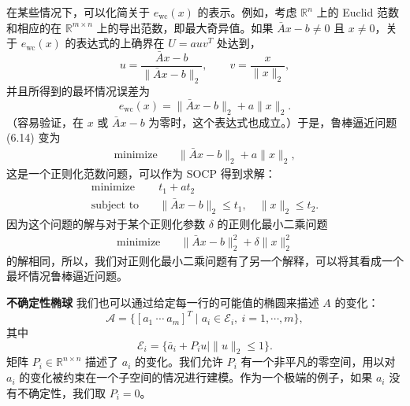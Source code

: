 \documentclass[UTF8, 12pt, fontset=fandol, oneside]{ctexart}
\begin{document}
在某些情况下，可以化简关于 $e_{\mathrm{wc}}(x)$ 的表示。例如，考虑 $\mathbb{R}^n$ 上的 Euclid 范数和相应的在 $\mathbb{R}^{m\times n}$ 上的导出范数，即最大奇异值。如果 $\bar{A}x-b\neq 0$ 且 $x\neq 0$，关于 $e_{\mathrm{wc}}(x)$ 的表达式的上确界在 $U=auv^T$ 处达到，
\[
u=\frac{\bar{A}x-b}{\|\bar{A}x-b\|_2},\qquad
v=\frac{x}{\|x\|_2},
\]
并且所得到的最坏情况误差为
\[
e_{\mathrm{wc}}(x)=\|\bar{A}x-b\|_2+a\|x\|_2.
\]
（容易验证，在 $x$ 或 $\bar{A}x-b$ 为零时，这个表达式也成立。）于是，鲁棒逼近问题 (6.14) 变为
\[
\begin{aligned}
\text{minimize}\quad & \|\bar{A}x-b\|_2+a\|x\|_2,
\end{aligned}
\]
这是一个正则化范数问题，可以作为 SOCP 得到求解：
\[
\begin{aligned}
\text{minimize}\quad & t_1+at_2\\
\text{subject to}\quad & \|\bar{A}x-b\|_2\leq t_1,\quad \|x\|_2\leq t_2.
\end{aligned}
\]
因为这个问题的解与对于某个正则化参数 $\delta$ 的正则化最小二乘问题
\[
\begin{aligned}
\text{minimize}\quad & \|\bar{A}x-b\|_2^2+\delta\|x\|_2^2
\end{aligned}
\]
的解相同，所以，我们对正则化最小二乘问题有了另一个解释，可以将其看成一个最坏情况鲁棒逼近问题。

\noindent\textbf{不确定性椭球}\quad
我们也可以通过给定每一行的可能值的椭圆来描述 $A$ 的变化：
\[
\mathcal{A}=\{[a_1\ \cdots\ a_m]^T\mid a_i\in\mathcal{E}_i,\ i=1,\cdots,m\},
\]
其中
\[
\mathcal{E}_i=\{\bar{a}_i+P_iu\mid \|u\|_2\leq 1\}.
\]
矩阵 $P_i\in\mathbb{R}^{n\times n}$ 描述了 $a_i$ 的变化。我们允许 $P_i$ 有一个非平凡的零空间，用以对 $a_i$ 的变化被约束在一个子空间的情况进行建模。作为一个极端的例子，如果 $a_i$ 没有不确定性，我们取 $P_i=0$。
\end{document}
